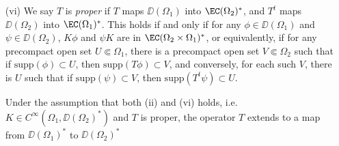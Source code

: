 \begin{theorem}
\begin{itemize}
    \item[(vi)] We say $T$ is \emph{proper} if $T$ maps $\DD(\Omega_1)$ into $\EC(\Omega_2)^*$, and $T^t$ maps $\DD(\Omega_2)$ into $\EC(\Omega_1)^*$. This holds if and only if for any $\phi \in \DD(\Omega_1)$ and $\psi \in \DD(\Omega_2)$, $K \phi$ and $\psi K$ are in $\EC(\Omega_2 \times \Omega_1)^*$, or equivalently, if for any precompact open set $U \Subset \Omega_1$, there is a precompact open set $V \Subset \Omega_2$ such that if $\text{supp}(\phi) \subset U$, then $\text{supp}(T \phi) \subset V$, and conversely, for each such $V$, there is $U$ such that if $\text{supp}(\psi) \subset V$, then $\text{supp}(T^t \psi) \subset U$.

    Under the assumption that both (ii) and (vi) holds, i.e. $K \in C^\infty(\Omega_1, \DD(\Omega_2)^*)$ and $T$ is proper, the operator $T$ extends to a map from $\DD(\Omega_1)^*$ to $\DD(\Omega_2)^*$
\end{itemize}

\end{theorem}
